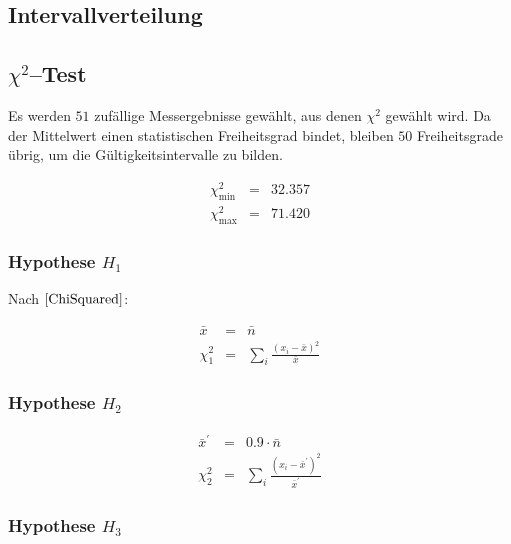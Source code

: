 \documentclass[12pt,a4paper]{scrartcl}
\numberwithin{equation}{section} %
\renewcommand{\[}{} %
\renewcommand{\]}{\noindent} %
\begin{document}
\hypertarget{intervallverteilung}{%
\subsection{Intervallverteilung}\label{intervallverteilung}}

\hypertarget{chi2test}{%
\subsection{\texorpdfstring{\(\chi^2\)--Test}{\textbackslash chi\^{}2--Test}}\label{chi2test}}

Es werden \(51\) zufällige Messergebnisse gewählt, aus denen \(\chi^2\)
gewählt wird. Da der Mittelwert einen statistischen Freiheitsgrad
bindet, bleiben \(50\) Freiheitsgrade übrig, um die
Gültigkeitsintervalle zu bilden.

\[
\begin{eqnarray}
    \chi^2_\mathrm{min} &=& 32.357 \\
    \chi^2_\mathrm{max} &=& 71.420
\end{eqnarray}
\]

\hypertarget{hypothese-h_1}{%
\subsubsection{\texorpdfstring{Hypothese
\(H_1\)}{Hypothese H\_1}}\label{hypothese-h_1}}

Nach \(\eqref{ChiSquared}\):

\[
\begin{eqnarray}
    \bar x &=& \bar n \\
    \chi^2_1 &=& \sum_i \frac{(x_i-\bar x)^2}{\bar x}
\end{eqnarray}
\]

\hypertarget{hypothese-h_2}{%
\subsubsection{\texorpdfstring{Hypothese
\(H_2\)}{Hypothese H\_2}}\label{hypothese-h_2}}

\[
\begin{eqnarray}
    \bar x^\prime &=& 0.9\cdot\bar n \\
    \chi^2_2 &=& \sum_i \frac{(x_i-\bar x^\prime)^2}{\bar x^\prime}
\end{eqnarray}
\]

\hypertarget{hypothese-h_3}{%
\subsubsection{\texorpdfstring{Hypothese
\(H_3\)}{Hypothese H\_3}}\label{hypothese-h_3}}
\end{document}
